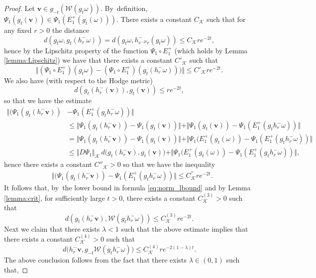 \documentclass[JEP,XML,SOM,Unicode,published]{cedram}
\theoremstyle{plain}
\theoremstyle{definition}
\numberwithin{equation}{subsection}
\newcommand\cK{\mathcal{K}}
\newcommand\cW{\mathcal{W}}
\newcommand{\bfv}{\boldsymbol{v}}
\begin{document}
\begin{proof}
Let ${\bfv} \in g_{-t} \left(\cW(g_{t}\omega)\right)$. By~definition,
$\Psi_1 (g_{t} ({\bfv})) \in \Psi_1 (E^+_1(g_{t}(\omega)))$. There exists a constant $C_\cK$ such that for any fixed $r>0$
the distance
\[
d(g_{t}\omega, g_{t} (h^-_r \omega))=
d(g_{t}\omega, h^-_{e^{-2t} r} (g_{t} \omega)) \leq C_\cK r e^{-2t},
\]
hence by the Lipschitz property of the function
$\Psi_1 \circ E^+_1$ (which holds by Lemma
\ref{lemma:Lipschitz}) we have that there exists
a constant $C'_\cK$ such that
\[
\bigl\Vert (\Psi_1 \circ E^+_1)(g_{t}\omega) - (\Psi_1 \circ E^+_1) (g_{t} (h^-_r \omega)))\bigr\Vert \leq C'_\cK r e^{-2t}.
\]
We also have (with respect to the Hodge metric)\vspace*{-3pt}
\[
d \left(g_{t} (h^-_r ({\bfv})), g_{t} ({\bfv})\right) \leq r e^{-2t},
\]
so that we have the estimate
\[
\begin{aligned}
\Vert (\Psi_1(g_{t} (h^-_r {\bfv})) &-
\Psi_1(E^+_1 (g_{t} h^-_r \omega)) \Vert \\
& \leq
\Vert \Psi_1(g_{t} (h^-_r {\bfv})) -
\Psi_1(g_{t} ({\bfv})) \Vert +
\Vert \Psi_1(g_{t} ({\bfv})) - \Psi_1(E^+_1 (g_{t} h^-_r \omega)) \Vert \\
& =
\Vert \Psi_1(g_{t} (h^-_r {\bfv})) -
\Psi_1(g_{t} ({\bfv})) \Vert +
\Vert \Psi_1(E^+_1 (g_{t} (\omega)) - \Psi_1(E^+_1 (g_{t} h^-_r \omega)) \Vert \\
& \leq \Vert D\Psi_1 \Vert_\cK\, d\Big(g_{t} (h^-_r {\bfv}), g_{t} ({\bfv})\Big) +
\Vert \Psi_1(E^+_1 (g_{t} (\omega)) - \Psi_1(E^+_1 (g_{t} h^-_r \omega)) \Vert,
\end{aligned}
\]
hence there exists a constant $C''_\cK>0$ so that we have the inequality\vspace*{-3pt}
\[
\begin{aligned}
&\Vert (\Psi_1(g_{t} (h^-_r {\bfv})) -
\Psi_1(E^+_1 (g_{t} h^-_r \omega)) \Vert \leq C^{''}_\cK r e^{-2t}.
\end{aligned}
\]
It follows that, by~the lower bound in formula \eqref{eq:norm_lbound} and by Lemma \ref{lemma:crit}, for sufficiently large $t>0$, there exists a constant $C^{(3)}_\cK>0$ such that\vspace*{-3pt}
\[
d \left(g_{t} (h^-_r {\bfv}), \cW (g_{t} h^-_r \omega)\right) \leq C^{(3)}_\cK r e^{-2t}.
\]
Next we claim that there exists $\lambda <1$ such that the above estimate implies that there exists
a constant $C^{(4)}_\cK >0$ such that\vspace*{-3pt}
\[
d\big(h^-_r {\bfv}, g_{-t}\cW (g_{t} h^-_r \omega)\big) \leq C^{(4)}_\cK r e^{-2(1-\lambda)t}.
\]
The above conclusion follows from the fact that there exists $\lambda \in (0,1)$ such that,

\end{proof}
\end{document}
